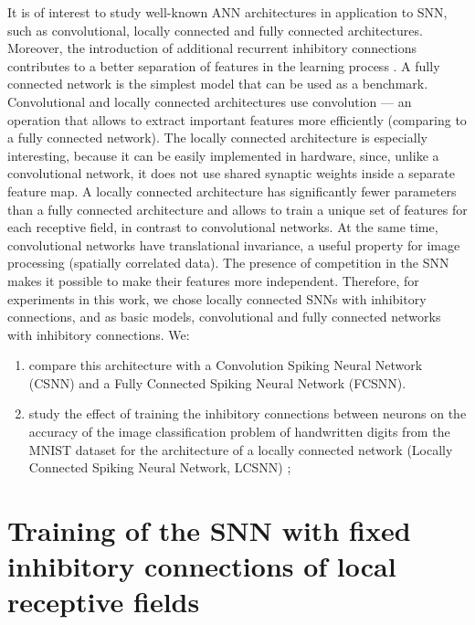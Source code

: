 \documentclass[a4paper]{article}
\begin{document}
It is of interest to study well-known ANN architectures in application to SNN, such as convolutional, locally connected and fully connected \cite{Khan_2020} architectures. Moreover, the introduction of additional recurrent inhibitory connections contributes to a better separation of features in the learning process \cite{MaxActiv1, MaxActiv2}. A fully connected network is the simplest model that can be used as a benchmark. Convolutional and locally connected architectures use convolution --- an operation that allows to extract important features more efficiently (comparing to a fully connected network). The locally connected architecture is especially interesting, because it can be easily implemented in hardware, since, unlike a convolutional network, it does not use shared synaptic weights  inside a separate feature map. A locally connected architecture has significantly fewer parameters than a fully connected architecture and allows to train a unique set of features for each receptive field, in contrast to convolutional networks. At the same time, convolutional networks have translational invariance, a useful property for image processing (spatially correlated data). The presence of competition in the SNN makes it possible to make their features more independent. Therefore, for experiments in this work, we chose locally connected SNNs with inhibitory connections, and as basic models, convolutional and fully connected networks with inhibitory connections. We:

\begin{enumerate}[i]

\item compare this architecture with a Convolution Spiking Neural Network (CSNN) and a Fully Connected Spiking Neural Network (FCSNN).

\item study the effect of training the inhibitory connections \cite{MaxActiv1, MaxActiv2, hardware_survey} between neurons on the accuracy of the image classification problem of handwritten digits from the MNIST \cite{MNIST} dataset for the architecture of a locally connected network (Locally Connected Spiking Neural Network, LCSNN) \cite{saunders2019locally};

\end{enumerate}

\clearpage

\section{Training of the SNN with fixed inhibitory connections of local receptive fields}
\end{document}
